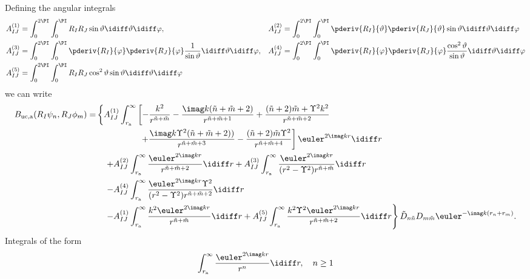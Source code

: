 Defining the angular integrals
\begin{equation}\label{Eq2:infiniteElementsSurfaceIntegrals}
\begin{alignedat}{2}
	& A_{IJ}^{(1)} = \int_0^{2\PI}\int_0^\PI R_I R_J\sin\vartheta\idiff\vartheta\idiff\varphi,\qquad\qquad && A_{IJ}^{(2)} = \int_0^{2\PI}\int_0^\PI \pderiv{R_I}{\vartheta} \pderiv{R_J}{\vartheta}\sin\vartheta\idiff\vartheta\idiff\varphi\\
	& A_{IJ}^{(3)} = \int_0^{2\PI}\int_0^\PI \pderiv{R_I}{\varphi} \pderiv{R_J}{\varphi}\frac{1}{\sin\vartheta}\idiff\vartheta\idiff\varphi, \quad && A_{IJ}^{(4)} = \int_0^{2\PI}\int_0^\PI \pderiv{R_I}{\varphi} \pderiv{R_J}{\varphi}\frac{\cos^2\vartheta}{\sin\vartheta}\idiff\vartheta\idiff\varphi\\
	& A_{IJ}^{(5)} = \int_0^{2\PI}\int_0^\PI R_I R_J\cos^2\vartheta\sin\vartheta\idiff\vartheta\idiff\varphi
\end{alignedat}	
\end{equation}
we can write
\begin{align*}
	B_{\mathrm{uc},\mathrm{a}}(R_I\psi_n,R_J\phi_m) =&\left\{A_{IJ}^{(1)}\int_{r_{\mathrm{a}}}^{\infty}\left[-\frac{k^2}{r^{\tilde{n}+\tilde{m}}} - \frac{\imag k(\tilde{n}+\tilde{m}+2)}{r^{\tilde{n}+\tilde{m}+1}} +\frac{(\tilde{n}+2)\tilde{m}+\Upsilon^2k^2}{r^{\tilde{n}+\tilde{m}+2}}\right.\right.\\
	&\left.\left.\quad\qquad\qquad + \frac{\imag k \Upsilon^2 (\tilde{n}+\tilde{m}+2))}{r^{\tilde{n}+\tilde{m}+3}} - \frac{(\tilde{n}+2)\tilde{m}\Upsilon^2}{r^{\tilde{n}+\tilde{m}+4}}\right]\euler^{2\imag k r}\idiff r\right.\\
	&\left.\quad + A_{IJ}^{(2)}\int_{r_{\mathrm{a}}}^{\infty}\frac{\euler^{2\imag k r}}{r^{\tilde{n}+\tilde{m}+2}}\idiff r +A_{IJ}^{(3)}\int_{r_{\mathrm{a}}}^{\infty}\frac{\euler^{2\imag k r}}{(r^2-\Upsilon^2)r^{\tilde{n}+\tilde{m}}}\idiff r\right.\\
	&\left.\quad - A_{IJ}^{(4)}\int_{r_{\mathrm{a}}}^{\infty}\frac{\euler^{2\imag k r}\Upsilon^2}{(r^2-\Upsilon^2)r^{\tilde{n}+\tilde{m}+2}}\idiff r\right.\\
	&\left.\quad- A_{IJ}^{(1)}\int_{r_{\mathrm{a}}}^{\infty}\frac{k^2\euler^{2\imag k r}}{r^{\tilde{n}+\tilde{m}}}\idiff r + A_{IJ}^{(5)}\int_{r_{\mathrm{a}}}^{\infty}\frac{k^2\Upsilon^2\euler^{2\imag k r}}{r^{\tilde{n}+\tilde{m}+2}}\idiff r\right\}\tilde{D}_{n\tilde{n}}D_{m\tilde{m}}\euler^{-\imag k (r_n+r_m)}.
\end{align*}
Integrals of the form
\begin{equation*}
	\int_{r_{\mathrm{a}}}^\infty\frac{\euler^{2\imag k r}}{r^n}\idiff r,\quad n\geq 1
\end{equation*}
